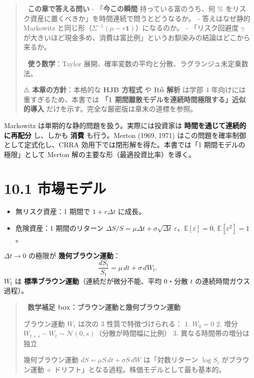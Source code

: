 \documentclass[11pt,a4paper]{report}
\begin{document}
\begin{quote}
🎯 \textbf{この章で答える問い}
- 「\textbf{今この瞬間} 持っている富のうち、何 \% をリスク資産に置くべきか」を時間連続で問うとどうなるか。
- 答えはなぜ静的 Markowitz と同じ形（$\Sigma^{-1}(\mu - r\mathbf{1})$）になるのか。
- 「リスク回避度 $\gamma$ が大きいほど現金多め、消費は富比例」というお馴染みの結論はどこから来るか。

📐 \textbf{使う数学}：Taylor 展開、確率変数の平均と分散、ラグランジュ未定乗数法。

⚠️ \textbf{本章の方針}：本格的な \textbf{HJB 方程式} や \textbf{Itô 解析} は学部 4 年向けには重すぎるため、本書では \textbf{「1 期間離散モデルを連続時間極限する」近似的導入} だけを示す。完全な厳密版は章末の道標を参照。
\end{quote}

Markowitz は単期的な静的問題を扱う。実際には投資家は \textbf{時間を通じて連続的に再配分} し、しかも \textbf{消費} も行う。Merton (1969, 1971) はこの問題を確率制御として定式化し、CRRA 効用下では閉形解を得た。本書では「1 期間モデルの極限」として Merton 解の主要な形（最適投資比率）を導く。

\section{10.1 市場モデル}

\begin{itemize}
\item 無リスク資産：1 期間で $1 + r \Delta t$ に成長。
\item 危険資産：1 期間のリターン $\Delta S / S = \mu \Delta t + \sigma \sqrt{\Delta t}\, \varepsilon$、$\mathbb{E}[\varepsilon] = 0$, $\mathbb{E}[\varepsilon^2] = 1$。
\end{itemize}

$\Delta t \to 0$ の極限が \textbf{幾何ブラウン運動}： \[ \frac{dS_t}{S_t} = \mu\, dt + \sigma\, dW_t. \] $W_t$ は \textbf{標準ブラウン運動}（連続だが微分不能、平均 0・分散 $t$ の連続時間ガウス過程）。

\begin{quote}
📐 \textbf{数学補足 box：ブラウン運動と幾何ブラウン運動}

ブラウン運動 $W_t$ は次の 3 性質で特徴づけられる：
1. $W_0 = 0$
2. 増分 $W_{t+s} - W_t \sim \mathcal{N}(0, s)$（分散が時間幅に比例）
3. 異なる時間帯の増分は独立

幾何ブラウン運動 $dS = \mu S\, dt + \sigma S\, dW$ は「対数リターン $\log S_t$ がブラウン運動 + ドリフト」となる過程。株価モデルとして最も基本的。
\end{quote}
\end{document}
